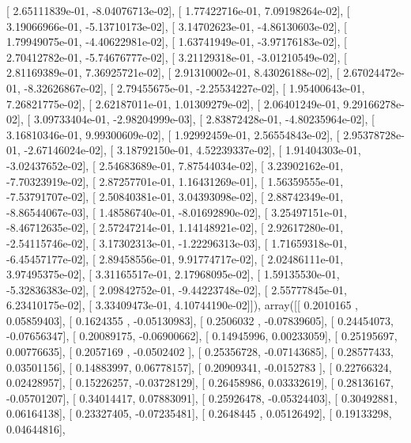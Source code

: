 \documentclass{article}
\begin{document}
       [  2.65111839e-01,  -8.04076713e-02],
       [  1.77422716e-01,   7.09198264e-02],
       [  3.19066966e-01,  -5.13710173e-02],
       [  3.14702623e-01,  -4.86130603e-02],
       [  1.79949075e-01,  -4.40622981e-02],
       [  1.63741949e-01,  -3.97176183e-02],
       [  2.70412782e-01,  -5.74676777e-02],
       [  3.21129318e-01,  -3.01210549e-02],
       [  2.81169389e-01,   7.36925721e-02],
       [  2.91310002e-01,   8.43026188e-02],
       [  2.67024472e-01,  -8.32626867e-02],
       [  2.79455675e-01,  -2.25534227e-02],
       [  1.95400643e-01,   7.26821775e-02],
       [  2.62187011e-01,   1.01309279e-02],
       [  2.06401249e-01,   9.29166278e-02],
       [  3.09733404e-01,  -2.98204999e-03],
       [  2.83872428e-01,  -4.80235964e-02],
       [  3.16810346e-01,   9.99300609e-02],
       [  1.92992459e-01,   2.56554843e-02],
       [  2.95378728e-01,  -2.67146024e-02],
       [  3.18792150e-01,   4.52239337e-02],
       [  1.91404303e-01,  -3.02437652e-02],
       [  2.54683689e-01,   7.87544034e-02],
       [  3.23902162e-01,  -7.70323919e-02],
       [  2.87257701e-01,   1.16431269e-01],
       [  1.56359555e-01,  -7.53791707e-02],
       [  2.50840381e-01,   3.04393098e-02],
       [  2.88742349e-01,  -8.86544067e-03],
       [  1.48586740e-01,  -8.01692890e-02],
       [  3.25497151e-01,  -8.46712635e-02],
       [  2.57247214e-01,   1.14148921e-02],
       [  2.92617280e-01,  -2.54115746e-02],
       [  3.17302313e-01,  -1.22296313e-03],
       [  1.71659318e-01,  -6.45457177e-02],
       [  2.89458556e-01,   9.91774717e-02],
       [  2.02486111e-01,   3.97495375e-02],
       [  3.31165517e-01,   2.17968095e-02],
       [  1.59135530e-01,  -5.32836383e-02],
       [  2.09842752e-01,  -9.44223748e-02],
       [  2.55777845e-01,   6.23410175e-02],
       [  3.33409473e-01,   4.10744190e-02]]), array([[ 0.2010165 ,  0.05859403],
       [ 0.1624355 , -0.05130983],
       [ 0.2506032 , -0.07839605],
       [ 0.24454073, -0.07656347],
       [ 0.20089175, -0.06900662],
       [ 0.14945996,  0.00233059],
       [ 0.25195697,  0.00776635],
       [ 0.2057169 , -0.0502402 ],
       [ 0.25356728, -0.07143685],
       [ 0.28577433,  0.03501156],
       [ 0.14883997,  0.06778157],
       [ 0.20909341, -0.0152783 ],
       [ 0.22766324,  0.02428957],
       [ 0.15226257, -0.03728129],
       [ 0.26458986,  0.03332619],
       [ 0.28136167, -0.05701207],
       [ 0.34014417,  0.07883091],
       [ 0.25926478, -0.05324403],
       [ 0.30492881,  0.06164138],
       [ 0.23327405, -0.07235481],
       [ 0.2648445 ,  0.05126492],
       [ 0.19133298,  0.04644816],
\end{document}
